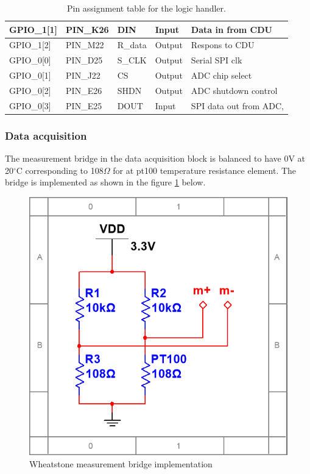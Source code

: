 \begin{table}[H]
\begin{tabular}{|l|l|l|l|l|}
   		GPIO\_1[1]	& PIN\_K26 	& DIN 				& Input			 & Data in from CDU \\ \hline
   		GPIO\_1[2]	& PIN\_M22 	& R\_data 			& Output		 & Respons to CDU \\ \hline
   		GPIO\_0[0]	& PIN\_D25 	& S\_CLK 			& Output		 & Serial SPI clk \\ \hline
   		GPIO\_0[1]	& PIN\_J22 	& CS 				& Output		 & ADC chip select \\ \hline
   		GPIO\_0[2]	& PIN\_E26 	& SHDN 				& Output		 & ADC shutdown control \\ \hline
   		GPIO\_0[3]	& PIN\_E25 	& DOUT 				& Input			 & SPI data out from ADC, \\ \hline
    \end{tabular}
    \caption{Pin assignment table for the logic handler.}
\end{table}

\subsubsection{Data acquisition}
The measurement bridge in the data acquisition block is balanced to have 0V at 20$^\circ$C corresponding to 108$\Omega$ for at pt100 temperature resistance element. The bridge is implemented as shown in the figure \ref{fig:m_bridge} below.

\begin{figure}[H]
	\centering
	\includegraphics[width=.4\textwidth]{billeder/m_bridge}
	\caption{Wheatstone measurement bridge implementation}
	\label{fig:m_bridge}
\end{figure}

